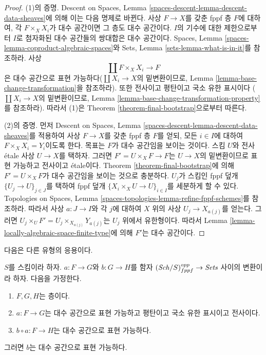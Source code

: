 \begin{proof}
(1)의 증명. Descent on Spaces, Lemma
\ref{spaces-descent-lemma-descent-data-sheaves}에 의해 이는 다음
명제로 바뀐다. 사상 $F \to X$를 갖춘 fppf 층 $F$에 대하여,
각 $F \times_X X_i$가 대수 공간이면 그 층도 대수 공간이다.
$I$의 기수에 대한 제한으로부터 $I$로 첨자화된 대수 공간들의
쌍대합은 대수 공간이다. Spaces, Lemma
\ref{spaces-lemma-coproduct-algebraic-spaces}와
Sets, Lemma \ref{sets-lemma-what-is-in-it}를 참조하라.
사상
$$
\coprod F \times_X X_i \longrightarrow F
$$
은 대수 공간으로 표현 가능하다($\coprod X_i \to X$의
밑변환이므로, Lemma \ref{lemma-base-change-transformation}을 참조하라).
또한 전사이고 평탄이고 국소 유한 표시이다
($\coprod X_i \to X$의 밑변환이므로, Lemma
\ref{lemma-base-change-transformation-property}를 참조하라).
따라서 (1)은 Theorem \ref{theorem-final-bootstrap}으로부터 따른다.

\medskip\noindent
(2)의 증명. 먼저 Descent on Spaces, Lemma
\ref{spaces-descent-lemma-descent-data-sheaves}를 적용하여
사상 $F \to X$를 갖춘 fppf 층 $F$를 얻되,
모든 $i \in I$에 대하여 $F \times_X X_i = Y_i$이도록 한다.
목표는 $F$가 대수 공간임을 보이는 것이다.
스킴 $U$와 전사 \'etale 사상 $U \to X$를 택하자.
그러면 $F' = U \times_X F \to F$는 $U \to X$의 밑변환이므로
표현 가능하고 전사이고 \'etale이다.
Theorem \ref{theorem-final-bootstrap}에 의해
$F' = U \times_X F$가 대수 공간임을 보이는 것으로 충분하다.
$U_j$가 스킴인 fppf 덮개 $\{U_j \to U\}_{j \in J}$를 택하여
fppf 덮개 $\{X_i \times_X U \to U\}_{i \in I}$를 세분하게 할 수 있다.
Topologies on Spaces, Lemma
\ref{spaces-topologies-lemma-refine-fppf-schemes}를 참조하라.
따라서 사상 $a : J \to I$와 각 $j$에 대하여 $X$ 위의 사상
$U_j \to X_{a(j)}$를 얻는다.
그러면
$U_j \times_U F' = U_j \times_{X_{a(j)}} Y_{a(j)}$는
$U_j$ 위에서 유한형이다.
따라서 Lemma \ref{lemma-locally-algebraic-space-finite-type}에 의해
$F'$는 대수 공간이다.
\end{proof}

\noindent
다음은 다른 유형의 응용이다.

\begin{lemma}
\label{lemma-representable-by-spaces-cover}
$S$를 스킴이라 하자. $a : F \to G$와 $b : G \to H$를
함자 $(\mathit{Sch}/S)_{fppf}^{opp} \to \textit{Sets}$ 사이의 변환이라 하자.
다음을 가정한다.
\begin{enumerate}
\item $F, G, H$는 층이다.
\item $a : F \to G$는 대수 공간으로 표현 가능하고 평탄이고
국소 유한 표시이고 전사이다.
\item $b \circ a : F \to H$는 대수 공간으로 표현 가능하다.
\end{enumerate}
그러면 $b$는 대수 공간으로 표현 가능하다.
\end{lemma}

